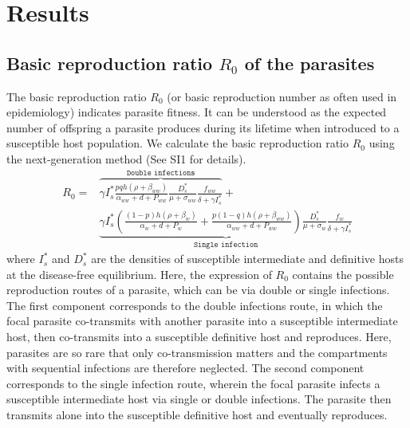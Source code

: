 \documentclass[a4paper]{scrartcl}
\begin{document}
\section*{Results}
\subsection*{Basic reproduction ratio $R_0$ of the parasites}

The basic reproduction ratio $R_0$ (or basic reproduction number as often used in epidemiology) indicates parasite fitness. 
It can be understood as the expected number of offspring a parasite produces during its lifetime when introduced to a susceptible host population. 
We calculate the basic reproduction ratio $R_0$ using the next-generation method \citep{Diekmann1990, Diekmann2009, hurford:JRSI:2010} (See SI1 for details).
%
\begin{align}
R_0 = & \overbrace{\gamma I_s^* \frac{p q h (\rho +  \beta_{ww})}{\alpha_{ww} + d + P_{ww}} \frac{D_s^*}{\mu +\sigma_{ww}} \frac{f_{ww}}{\delta +\gamma I_s^*}}^{ \texttt{Double infections}} + \nonumber \\
& \underbrace{\gamma  I_s^* \left( \frac{ (1-p) h (\rho + \beta_w)}{\alpha_w + d + P_w} + \frac{p (1-q) h (\rho + \beta_{ww})}{\alpha_{ww} + d + P_{ww}} \right) \frac{D_s^*}{\mu + \sigma_w} \frac{f_w}{\delta +\gamma  I_s^*}}_{\texttt{Single infection}}
\end{align}
%
where $I_s^*$ and $D_s^*$ are the densities of susceptible intermediate and definitive hosts at the disease-free equilibrium. 
Here, the expression of $R_0$ contains the possible reproduction routes of a parasite, which can be via double or single infections. 
The first component corresponds to the double infections route, in which the focal parasite co-transmits with another parasite into a susceptible intermediate host, then co-transmits into a susceptible definitive host and reproduces. 
Here, parasites are so rare that only co-transmission matters and the compartments with sequential infections are therefore neglected. 
The second component corresponds to the single infection route, wherein the focal parasite infects a susceptible intermediate host via single or double infections. 
The parasite then transmits alone into the susceptible definitive host and eventually reproduces. 
\end{document}
